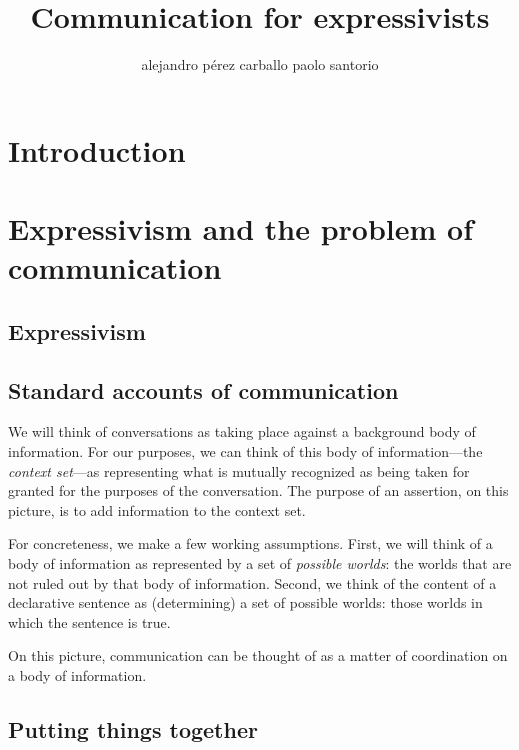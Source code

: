 \documentclass[11pt,article,oneside]{memoir}
\title{Communication for expressivists}
\author{\MakeLowercase{Alejandro P\'erez Carballo \amper Paolo Santorio}}
\begin{document}
\maketitle
	
\noindent

\section{Introduction}

\section{Expressivism and the problem of communication}

\subsection{Expressivism}

\subsection{Standard accounts of communication}

We will think of conversations as taking place against a background body of information. For our purposes, we can think of this body of information---the \emph{context set}---as representing what is mutually recognized as being taken for granted for the purposes of the conversation. The purpose of an assertion, on this picture, is to add information to the context set. 

For concreteness, we make a few working assumptions. First, we will think of a body of information as represented by a set of \emph{possible worlds}: the worlds that are not ruled out by that body of information. Second, we think of the content of a declarative sentence as (determining) a set of possible worlds: those worlds in which the sentence is true. 

On this picture, communication can be thought of as a matter of coordination on a body of information. 

\subsection{Putting things together}
\end{document}

